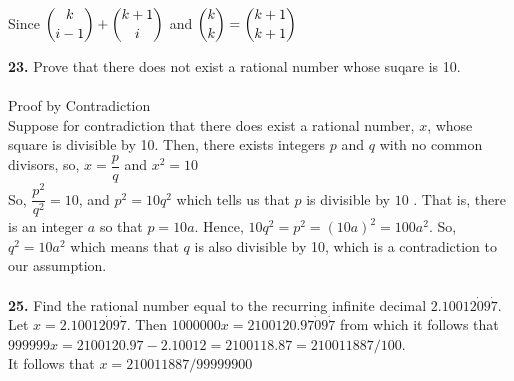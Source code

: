 \documentclass[paper=letter, fontsize=11pt]{scrartcl} %
\begin{document}
Since $\dbinom{k}{i-1} + \dbinom{k+1}{i}$ and $\dbinom{k}{k} = \dbinom{k+1}{k+1}$

\textbf{23.} Prove that there does not exist a rational number whose suqare is 10. \\
\\

Proof by Contradiction \\
Suppose for contradiction that there does exist a rational number, $x$, whose square is 
divisible by 10. Then, there exists integers $p$ and $q$ with no common divisors, so, 
$x = \dfrac{p}{q}$ and $x^2 = 10$ \\

So, $\dfrac{p^2}{q^2} = 10$, and $p^2 = 10q^2$ which tells us that $p$ is divisible by $10$
. That is, there is an integer $a$ so that $p = 10a$. Hence, $10q^2 = p^2 = (10a)^2 = 
100a^2$. So, $q^2 = 10a^2$ which means that $q$ is also divisible by 10, which is a 
contradiction to our assumption. \\
\\

\textbf{25.} Find the rational number equal to the recurring infinite decimal $2.10012\dot{0}9\dot{7}$. \\

Let $x = 2.10012\dot{0}9\dot{7}$. Then $1000000x = 2100120.97\dot{0}9\dot{7}$ from which it follows that $999999x = 2100120.97 - 2.10012 = 2100118.87 = 210011887/100$. \\
It follows
that $x = 210011887/99999900$
\end{document}
